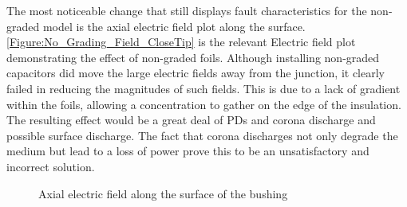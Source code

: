 The most noticeable change that still displays fault characteristics for the non-graded model is the axial electric field plot along the surface. \ref{Figure:No_Grading_Field_CloseTip} is the relevant Electric field plot demonstrating the effect of non-graded foils. Although installing non-graded capacitors did move the large electric fields away from the junction, it clearly failed in reducing the magnitudes of such fields. This is due to a lack of gradient within the foils, allowing a concentration to gather on the edge of the insulation. The resulting effect would be a great deal of PDs and corona discharge and possible surface discharge. The fact that corona discharges not only degrade the medium but lead to a loss of power prove this to be an unsatisfactory and incorrect solution.

\begin{figure}[!h]
  \centering
{} 
\caption{Axial electric field along the surface of the bushing}
\label{Figure:Nogradaxialfieldwhole}
\end{figure}

